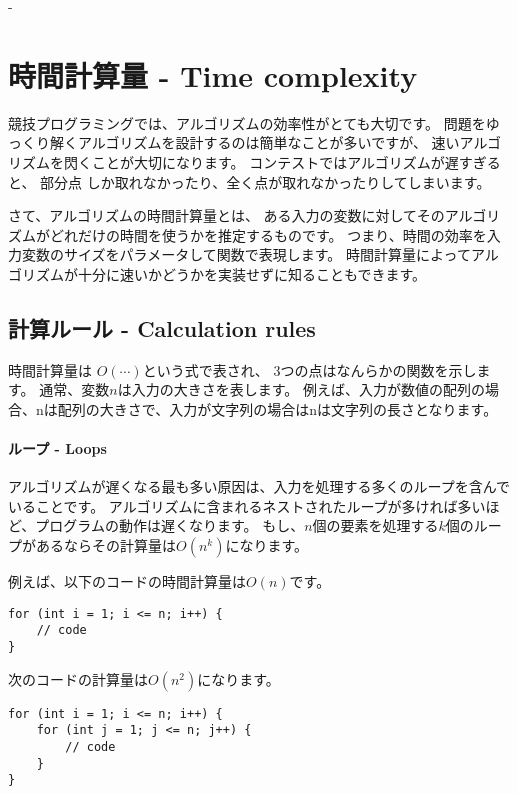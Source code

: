 - \chapter{時間計算量 - Time complexity}


競技プログラミングでは、アルゴリズムの効率性がとても大切です。
問題をゆっくり解くアルゴリズムを設計するのは簡単なことが多いですが、
速いアルゴリズムを閃くことが大切になります。
コンテストではアルゴリズムが遅すぎると、
部分点 しか取れなかったり、全く点が取れなかったりしてしまいます。

さて、アルゴリズムの時間計算量とは、
ある入力の変数に対してそのアルゴリズムがどれだけの時間を使うかを推定するものです。
つまり、時間の効率を入力変数のサイズをパラメータして関数で表現します。
時間計算量によってアルゴリズムが十分に速いかどうかを実装せずに知ることもできます。

\section{計算ルール - Calculation rules}

時間計算量は $O(\cdots)$という式で表され、
3つの点はなんらかの関数を示します。
通常、変数$n$は入力の大きさを表します。
例えば、入力が数値の配列の場合、nは配列の大きさで、入力が文字列の場合はnは文字列の長さとなります。

\subsubsection*{ループ - Loops}

アルゴリズムが遅くなる最も多い原因は、入力を処理する多くのループを含んでいることです。
アルゴリズムに含まれるネストされたループが多ければ多いほど、プログラムの動作は遅くなります。
もし、$n$個の要素を処理する$k$個のループがあるならその計算量は$O(n^k)$になります。

例えば、以下のコードの時間計算量は$O(n)$です。

\begin{lstlisting}
for (int i = 1; i <= n; i++) {
    // code
}
\end{lstlisting}

次のコードの計算量は$O(n^2)$になります。

\begin{lstlisting}
for (int i = 1; i <= n; i++) {
    for (int j = 1; j <= n; j++) {
        // code
    }
}
\end{lstlisting}

